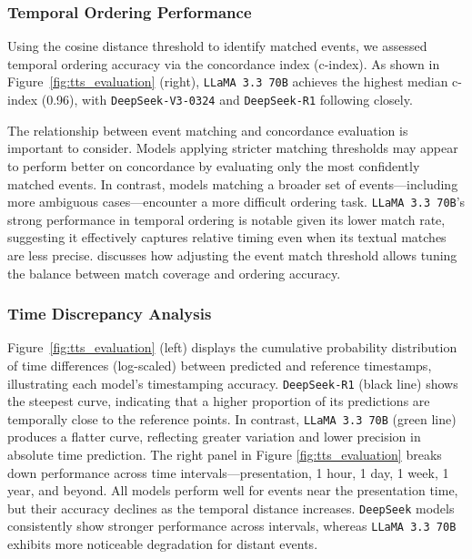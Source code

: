 \subsubsection{Temporal Ordering Performance}
Using the cosine distance threshold to identify matched events, we assessed temporal ordering accuracy via the concordance index (c-index).
As shown in Figure~\ref{fig:tts_evaluation} (right), \texttt{LLaMA 3.3 70B} achieves the highest median c-index (0.96), with \texttt{DeepSeek-V3-0324} and \texttt{DeepSeek-R1} following closely.



The relationship between event matching and concordance evaluation is important to consider. Models applying stricter matching thresholds may appear to perform better on concordance by evaluating only the most confidently matched events. In contrast, models matching a broader set of events—including more ambiguous cases—encounter a more difficult ordering task. \texttt{LLaMA 3.3 70B}’s strong performance in temporal ordering is notable given its lower match rate, suggesting it effectively captures relative timing even when its textual matches are less precise.
 discusses how adjusting the event match threshold allows tuning the balance between match coverage and ordering accuracy.

\subsubsection{Time Discrepancy Analysis}
Figure~\ref{fig:tts_evaluation} (left) displays the cumulative probability distribution of time differences (log-scaled) between predicted and reference timestamps, illustrating each model’s timestamping accuracy.
\texttt{DeepSeek-R1} (black line) shows the steepest curve, indicating that a higher proportion of its predictions are temporally close to the reference points. In contrast, \texttt{LLaMA 3.3 70B} (green line) produces a flatter curve, reflecting greater variation and lower precision in absolute time prediction. The right panel in Figure \ref{fig:tts_evaluation} breaks down performance across time intervals—presentation, 1 hour, 1 day, 1 week, 1 year, and beyond. All models perform well for events near the presentation time, but their accuracy declines as the temporal distance increases. \texttt{DeepSeek} models consistently show stronger performance across intervals, whereas \texttt{LLaMA 3.3 70B} exhibits more noticeable degradation for distant events.

